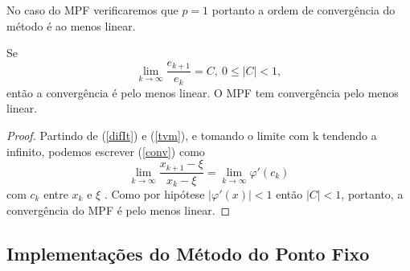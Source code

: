 No caso do MPF verificaremos que $p = 1$ portanto a ordem de convergência do
método é ao menos linear.
\begin{prop}
    Se
    \begin{equation}\label{conv}
        \lim_{k \to \infty} \frac{e_{k+1}}{e_k} = C, \ 0 \leq |C| < 1,
    \end{equation}
    então a convergência é pelo menos linear. O MPF tem convergência pelo menos linear.
\end{prop}
\begin{proof}
    Partindo de (\ref{difIt}) e (\ref{tvm}), e tomando o  limite com k tendendo a infinito, podemos escrever (\ref{conv}) como
    \begin{equation*} %
        \lim_{k \to \infty} \frac{x_{k+1} - \xi}{x_k - \xi} = \lim_{k \to \infty}\varphi'(c_k)
    \end{equation*} %
    com $c_k$ entre $x_k$ e $\xi$
    . %
    Como por hipótese $|\varphi'(x)| < 1$ então $|C| < 1$, portanto, a convergência
    do MPF é pelo menos linear.
\end{proof}
\newpage

\subsection{Implementações do Método do Ponto Fixo}

